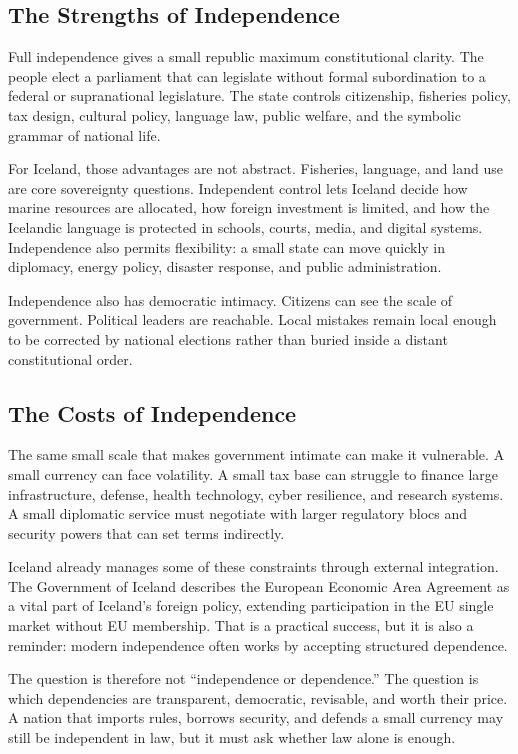 \documentclass[11pt,a4paper]{article}
\begin{document}
\subsection{The Strengths of Independence}
Full independence gives a small republic maximum constitutional clarity. The people elect a parliament that can legislate without formal subordination to a federal or supranational legislature. The state controls citizenship, fisheries policy, tax design, cultural policy, language law, public welfare, and the symbolic grammar of national life.

For Iceland, those advantages are not abstract. Fisheries, language, and land use are core sovereignty questions. Independent control lets Iceland decide how marine resources are allocated, how foreign investment is limited, and how the Icelandic language is protected in schools, courts, media, and digital systems. Independence also permits flexibility: a small state can move quickly in diplomacy, energy policy, disaster response, and public administration.

Independence also has democratic intimacy. Citizens can see the scale of government. Political leaders are reachable. Local mistakes remain local enough to be corrected by national elections rather than buried inside a distant constitutional order.

\subsection{The Costs of Independence}
The same small scale that makes government intimate can make it vulnerable. A small currency can face volatility. A small tax base can struggle to finance large infrastructure, defense, health technology, cyber resilience, and research systems. A small diplomatic service must negotiate with larger regulatory blocs and security powers that can set terms indirectly.

Iceland already manages some of these constraints through external integration. The Government of Iceland describes the European Economic Area Agreement as a vital part of Iceland's foreign policy, extending participation in the EU single market without EU membership.\cite{govicelandeurope} That is a practical success, but it is also a reminder: modern independence often works by accepting structured dependence.

The question is therefore not ``independence or dependence.'' The question is which dependencies are transparent, democratic, revisable, and worth their price. A nation that imports rules, borrows security, and defends a small currency may still be independent in law, but it must ask whether law alone is enough.
\end{document}
